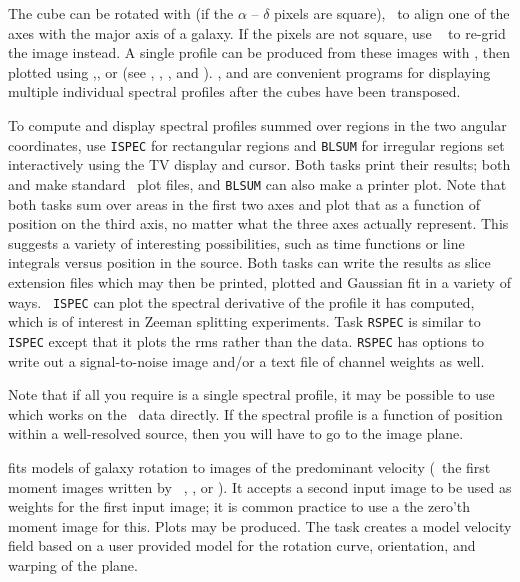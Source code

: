      The cube can be rotated with {\tt {}} (if the $\alpha$
-- $\delta$ pixels are square), \eg\ to align one of the axes with the
major axis of a galaxy.  If the pixels are not square, use {\tt
{}} to re-grid the image instead.  A single profile can be
produced from these images with {\tt {}}, then plotted using
{\tt {}},{\tt {}}, or {\tt {}} (see
, , , and ).
{\tt {}}, {\tt {}} and {\tt {}} are
convenient programs for displaying multiple individual spectral
profiles after the cubes have been transposed.

     To compute and display spectral profiles summed over regions in
the two angular coordinates, use {\tt ISPEC} for rectangular regions
and {\tt BLSUM} for irregular regions set interactively using the TV
display and cursor.  Both tasks print their results; both {\tt
{}} and {\tt {}} make standard \AIPS\ plot files,
and {\tt BLSUM} can also make a printer plot.  Note that both tasks
sum over areas in the first two axes and plot that as a function of
position on the third axis, no matter what the three axes actually
represent.  This suggests a variety of interesting possibilities, such
as time functions or line integrals versus position in the source.
Both tasks can write the results as slice extension files which may
then be printed, plotted and Gaussian fit in a variety of ways.  {\tt
ISPEC} can plot the spectral derivative of the profile it has
computed, which is of interest in Zeeman splitting experiments.  Task
{\tt RSPEC} is similar to {\tt ISPEC} except that it plots the rms
rather than the data.  {\tt RSPEC} has options to write out a
signal-to-noise image and/or a text file of channel weights as
well.

     Note that if all you require is a single spectral profile, it may
be possible to use {\tt {}} which works on the \uv\ data
directly. If the spectral profile is a function of position within a
well-resolved source, then you will have to go to the image plane.

    {\tt {}} fits models of galaxy rotation to images of the
predominant velocity (\eg\ the first moment images written by {\tt
{}}, {\tt {}}, or {\tt {}}).  It accepts
a second input image to be used as weights for the first input image;
it is common practice to use a the zero'th moment image for this.
Plots may be produced.  The task {\tt {}} creates a model
velocity field based on a user provided model for the rotation curve,
orientation, and warping of the plane.

